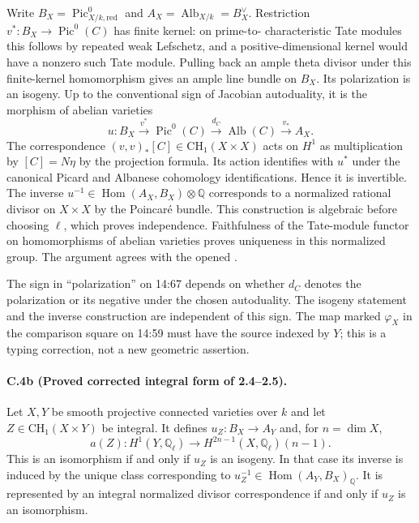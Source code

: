 Write $B_X=\operatorname{Pic}^0_{X/k,\mathrm{red}}$ and
$A_X=\operatorname{Alb}_{X/k}=B_X^\vee$. Restriction
$v^*:B_X\to\operatorname{Pic}^0(C)$ has finite kernel: on prime-to-
characteristic Tate modules this follows by repeated weak Lefschetz,
and a positive-dimensional kernel would have a nonzero such Tate
module. Pulling back an ample theta divisor under this finite-kernel
homomorphism gives an ample line bundle on $B_X$. Its polarization is
an isogeny. Up to the conventional sign of Jacobian autoduality, it is
the morphism of abelian varieties
\[
 u:B_X\xrightarrow{v^*}\operatorname{Pic}^0(C)
 \xrightarrow{d_C}\operatorname{Alb}(C)
 \xrightarrow{v_*}A_X.
\]
The correspondence $(v,v)_*[C]\in\mathrm{CH}_1(X\times X)$ acts on
$H^1$ as multiplication by $[C]=N\eta$ by the projection formula.
Its action identifies with $u^*$ under the canonical Picard and
Albanese cohomology identifications. Hence it is invertible. The inverse
$u^{-1}\in\operatorname{Hom}(A_X,B_X)\otimes\mathbb Q$ corresponds to
a normalized rational divisor on $X\times X$ by the Poincar\'e bundle.
This construction is algebraic before choosing $\ell$, which proves
independence. Faithfulness of the Tate-module functor on homomorphisms
of abelian varieties proves uniqueness in this normalized group.
The argument agrees with the opened
\citet[Appendix, Theorem 2A9(5)--(6)]{cyKleiman1968}.

The sign in ``polarization'' on 14:67 depends on whether $d_C$ denotes
the polarization or its negative under the chosen autoduality. The
isogeny statement and the inverse construction are independent of this
sign. The map marked $\varphi_X$ in the comparison square on 14:59 must
have the source indexed by $Y$; this is a typing correction, not a new
geometric assertion.

\paragraph{C.4b (Proved corrected integral form of 2.4--2.5).}
Let $X,Y$ be smooth projective connected varieties over $k$ and let
$Z\in\mathrm{CH}_1(X\times Y)$ be integral. It defines
$u_Z:B_X\to A_Y$ and, for $n=\dim X$,
\[
 a(Z):H^1(Y,\mathbb Q_\ell)\longrightarrow
 H^{2n-1}(X,\mathbb Q_\ell)(n-1).
\]
This is an isomorphism if and only if $u_Z$ is an isogeny. In that case
its inverse is induced by the unique class corresponding to
$u_Z^{-1}\in\operatorname{Hom}(A_Y,B_X)_{\mathbb Q}$. It is represented
by an integral normalized divisor correspondence if and only if
$u_Z$ is an isomorphism.

